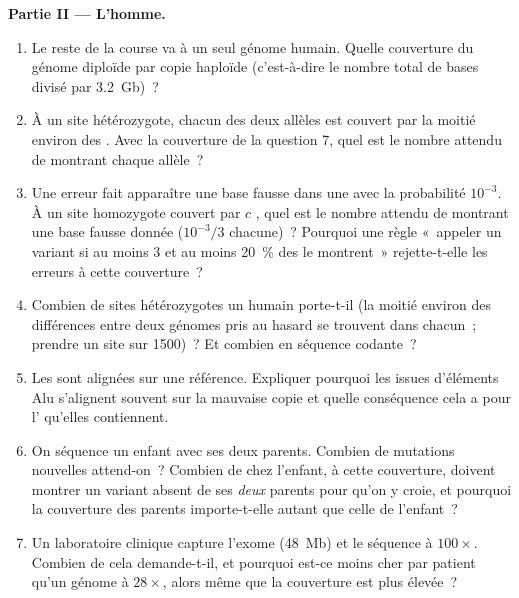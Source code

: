 \begin{problem}
\medskip
\noindent\textbf{Partie II --- L'homme.}
\begin{enumerate}[resume]
  \item Le reste de la course va à un seul génome humain. Quelle
        couverture du génome diploïde par copie haploïde (c'est-à-dire
        le nombre total de bases divisé par \qty{3.2}{Gb})~?
  \item À un site hétérozygote, chacun des deux allèles est couvert par
        la moitié environ des . Avec la couverture de la
        question 7, quel est le nombre attendu de  montrant
        chaque allèle~?
  \item Une erreur fait apparaître une base fausse dans une 
        avec la probabilité $10^{-3}$. À un site homozygote couvert par
        $c$ , quel est le nombre attendu de  montrant
        une base fausse donnée ($10^{-3}/3$ chacune)~? Pourquoi une
        règle «~appeler un variant si au moins $3$  et au moins
        \qty{20}{\%} des  le montrent~» rejette-t-elle les
        erreurs à cette couverture~?
  \item Combien de sites hétérozygotes un humain porte-t-il (la moitié
        environ des différences entre deux génomes pris au hasard se
        trouvent dans chacun~; prendre un site sur \num{1500})~? Et
        combien en séquence codante~?
  \item Les  sont alignées sur une référence. Expliquer
        pourquoi les  issues d'éléments Alu s'alignent souvent
        sur la mauvaise copie et quelle conséquence cela a pour l' qu'elles contiennent.
  \item On séquence un enfant avec ses deux parents. Combien de
        mutations nouvelles attend-on~? Combien de  chez
        l'enfant, à cette couverture, doivent montrer un variant absent
        de ses \emph{deux} parents pour qu'on y croie, et pourquoi la
        couverture des parents importe-t-elle autant que celle de
        l'enfant~?
  \item Un laboratoire clinique capture l'exome (\qty{48}{Mb}) et le
        séquence à $100\times$. Combien de  cela demande-t-il,
        et pourquoi est-ce moins cher par patient qu'un génome à
        $28\times$, alors même que la couverture est plus élevée~?
\end{enumerate}


\end{problem}
